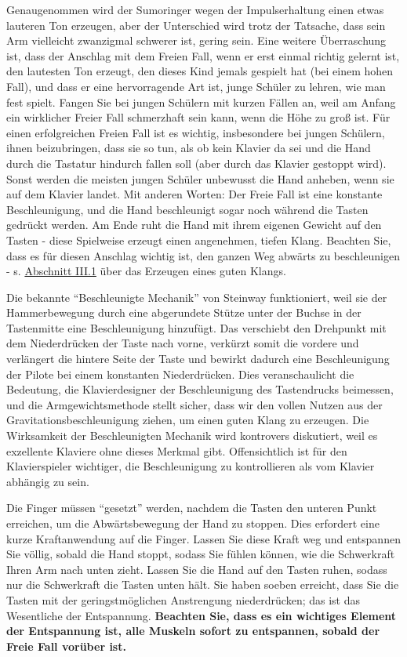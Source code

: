 Genaugenommen wird der Sumoringer wegen der Impulserhaltung einen etwas lauteren Ton erzeugen, aber der Unterschied wird trotz der Tatsache, dass sein Arm vielleicht zwanzigmal schwerer ist, gering sein.
Eine weitere Überraschung ist, dass der Anschlag mit dem Freien Fall, wenn er erst einmal richtig gelernt ist, den lautesten Ton erzeugt, den dieses Kind jemals gespielt hat (bei einem hohen Fall), und dass er eine hervorragende Art ist, junge Schüler zu lehren, wie man fest spielt.
Fangen Sie bei jungen Schülern mit kurzen Fällen an, weil am Anfang ein wirklicher Freier Fall schmerzhaft sein kann, wenn die Höhe zu groß ist.
Für einen erfolgreichen Freien Fall ist es wichtig, insbesondere bei jungen Schülern, ihnen beizubringen, dass sie so tun, als ob kein Klavier da sei und die Hand durch die Tastatur hindurch fallen soll (aber durch das Klavier gestoppt wird).
Sonst werden die meisten jungen Schüler unbewusst die Hand anheben, wenn sie auf dem Klavier landet.
Mit anderen Worten: Der Freie Fall ist eine konstante Beschleunigung, und die Hand beschleunigt sogar noch während die Tasten gedrückt werden.
Am Ende ruht die Hand mit ihrem eigenen Gewicht auf den Tasten - diese Spielweise erzeugt einen angenehmen, tiefen Klang.
Beachten Sie, dass es für diesen Anschlag wichtig ist, den ganzen Weg abwärts zu beschleunigen - s. \hyperref[c1iii1]{Abschnitt III.1} über das Erzeugen eines guten Klangs.

Die bekannte \enquote{Beschleunigte Mechanik} von Steinway funktioniert, weil sie der Hammerbewegung durch eine abgerundete Stütze unter der Buchse in der Tastenmitte eine Beschleunigung hinzufügt.
Das verschiebt den Drehpunkt mit dem Niederdrücken der Taste nach vorne, verkürzt somit die vordere und verlängert die hintere Seite der Taste und bewirkt dadurch eine Beschleunigung der Pilote bei einem konstanten Niederdrücken.
Dies veranschaulicht die Bedeutung, die Klavierdesigner der Beschleunigung des Tastendrucks beimessen, und die Armgewichtsmethode stellt sicher, dass wir den vollen Nutzen aus der Gravitationsbeschleunigung ziehen, um einen guten Klang zu erzeugen.
Die Wirksamkeit der Beschleunigten Mechanik wird kontrovers diskutiert, weil es exzellente Klaviere ohne dieses Merkmal gibt.
Offensichtlich ist für den Klavierspieler wichtiger, die Beschleunigung zu kontrollieren als vom Klavier abhängig zu sein.

Die Finger müssen \enquote{gesetzt} werden, nachdem die Tasten den unteren Punkt erreichen, um die Abwärtsbewegung der Hand zu stoppen.
Dies erfordert eine kurze Kraftanwendung auf die Finger.
Lassen Sie diese Kraft weg und entspannen Sie völlig, sobald die Hand stoppt, sodass Sie fühlen können, wie die Schwerkraft Ihren Arm nach unten zieht.
Lassen Sie die Hand auf den Tasten ruhen, sodass nur die Schwerkraft die Tasten unten hält.
Sie haben soeben erreicht, dass Sie die Tasten mit der geringstmöglichen Anstrengung niederdrücken; das ist das Wesentliche der Entspannung.
\textbf{Beachten Sie, dass es ein wichtiges Element der Entspannung ist, alle Muskeln sofort zu entspannen, sobald der Freie Fall vorüber ist.}

